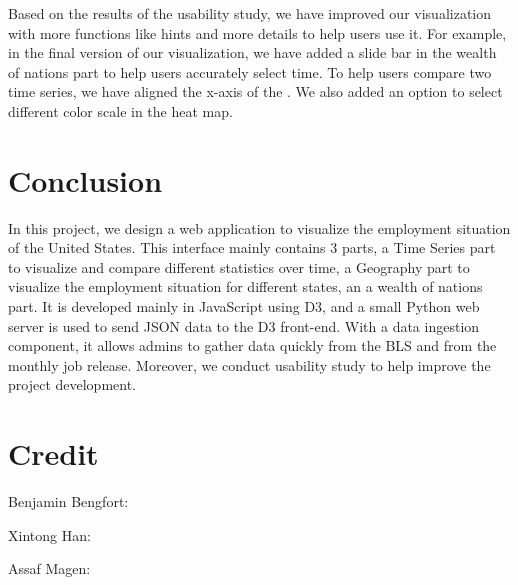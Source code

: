 \documentclass{sigchi}
\begin{document}
Based on the results of the usability study, we have improved our visualization with more functions like hints and more details to help users use it. For example, in the final version of our visualization, we have added a slide bar in the wealth of nations part to help users accurately select time. To help users compare two time series, we have aligned the x-axis of the . We also added an option to select different color scale in the heat map.




\section{Conclusion}
In this project, we design a web application to visualize the employment situation of the United States. This interface mainly contains 3 parts, a Time Series part to visualize and compare different statistics over time, a Geography part to visualize the employment situation for different states, an a wealth of nations part. It is developed mainly in JavaScript using D3, and a small Python web server is used to send JSON data to the D3 front-end. With a data ingestion component, it allows admins to gather data quickly from the BLS and from the monthly job release. Moreover, we conduct usability study to help improve the project development.

\section{Credit}

Benjamin Bengfort:

Xintong Han:

Assaf Magen:
\end{document}
